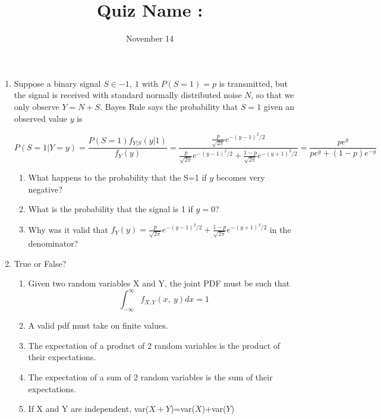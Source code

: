 \documentclass[11pt]{article}
\begin{document}
\title{Quiz \hfill Name : \underline{\hspace{3cm}}}
\date{November 14}
\maketitle
\begin{enumerate}
\item[Example 3.20] Suppose a binary signal $S\in{-1,\ 1}$ with $P(S=1)=p$ is transmitted, but the signal is received with standard normally distributed noise $N$, so that we only observe $Y=N+S$.  Bayes Rule says the probability that $S=1$ given an observed value $y$ is

$$P(S=1|Y=y)=\frac{P(S=1) f_{Y|S}(y|1)}{f_Y(y)}=\frac{\frac{p}{\sqrt{2\pi}}e^{-(y-1)^2/2}}{\frac{p}{\sqrt{2\pi}}e^{-(y-1)^2/2}+\frac{1-p}{\sqrt{2\pi}}e^{-(y+1)^2/2}}=\frac{pe^y}{pe^y+(1-p)e^{-y}}$$


\begin{enumerate}
\item What happens to the probability that the S=1 if $y$ becomes very negative?
\bigskip
\bigskip
\bigskip

\item What is the probability that the signal is 1 if $y=0$?
\bigskip
\bigskip
\bigskip
\bigskip

\item Why was it valid that $f_Y(y)=\frac{p}{\sqrt{2\pi}}e^{-(y-1)^2/2}+\frac{1-p}{\sqrt{2\pi}}e^{-(y+1)^2/2}$ in the denominator?
\bigskip
\bigskip
\bigskip
\bigskip

\end{enumerate}



\item True or False?

\begin{enumerate}
\item Given two random variables X and Y, the joint PDF must be such that $$\int_{-\infty}^{\infty} f_{X,Y}(x,\ y)dx=1$$
\item A valid pdf must take on finite values.
\item The expectation of a product of 2 random variables is the product of their expectations.
\item The expectation of a sum of 2 random variables is the sum of their expectations.
\item If X and Y are independent, var($X+Y$)=var($X$)+var($Y$)
\end{enumerate}


\end{enumerate}
\end{document}
